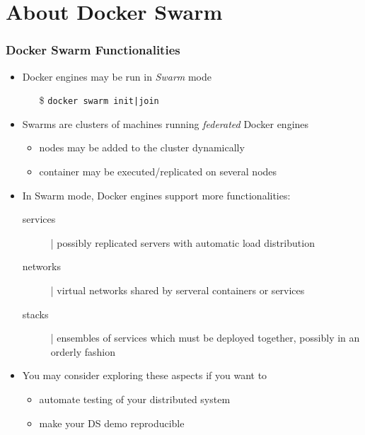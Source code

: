 \documentclass{beamer}\mode<presentation>{\usetheme{AMSBolognaFC}}
\begin{document}
\section{About Docker Swarm}

\begin{frame}%
    \frametitle{Docker Swarm Functionalities}


    \begin{itemize}
        \item Docker engines may be run in \emph{Swarm} mode
        \begin{itemize}
            \item[\$] \texttt{docker swarm init{\color{gray}|join}}
        \end{itemize}

        \vfill

        \item Swarms are \alert{clusters} of machines running \emph{federated} Docker engines
        \begin{itemize}
            \item nodes may be added to the cluster dynamically
            \item container may be executed/replicated on several nodes
        \end{itemize}

        \vfill

        \item In Swarm mode, Docker engines support more functionalities:
        \begin{description}
            \item[services] | possibly replicated servers with automatic load distribution
            \item[networks] | virtual networks shared by serveral containers or services
            \item[stacks] | ensembles of services which must be deployed together, possibly in an orderly fashion
        \end{description}

        \vfill

        \item You may consider exploring these aspects if you want to
        \begin{itemize}
            \item automate testing of your distributed system
            \item make your DS demo reproducible
        \end{itemize}

    \end{itemize}

\end{frame}
\end{document}
